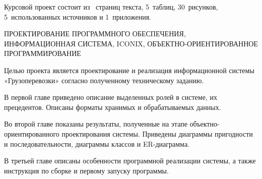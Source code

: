 \label{chap:abstract}

Курсовой проект состоит из 
\pageref*{LastPage}~страниц текста, 
5~таблиц, 
30~рисунков, 
5~использованных источников и 
1~приложения.

\MakeUppercase{
Проектирование программного обеспечения, информационная система, 
ICONIX, объектно-ориентированное программирование
}

Целью проекта является проектирование и реализация информационной 
системы «Грузоперевозки» согласно полученному техническому заданию. 

В первой главе приведено описание выделенных ролей в системе, их 
прецедентов. Описаны форматы хранимых и обрабатываемых данных. 
 
Во второй главе показаны результаты, полученные на этапе 
\mbox{объектно-ориентированного} проектирования системы. 
Приведены диаграммы пригодности и последовательности, 
диаграммы классов и ER-диаграмма. 
 
В третьей главе описаны особенности программной реализации системы, 
а также инструкция по сборке и первому запуску программы.
